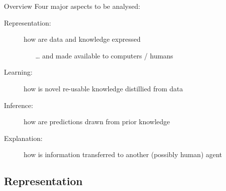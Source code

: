 \documentclass[presentation]{beamer}\mode<presentation>{\usetheme{AMSBolognaFC}}
\begin{document}
\begin{frame}{Overview}
    Four major aspects to be analysed:
    \vfill
    \begin{description}
        \item[Representation:] how are data and knowledge expressed
        \begin{itemize}
            \item[\ldots] and made available to computers / humans
        \end{itemize}
        
        \vfill

        \item[Learning:] how is novel re-usable knowledge distillied from data
        
        \vfill

        \item[Inference:] how are predictions drawn from prior knowledge
        
        \vfill

        \item[Explanation:] how is information transferred to another (possibly human) agent

    \end{description}
\end{frame}

\subsection{Representation}
\end{document}
